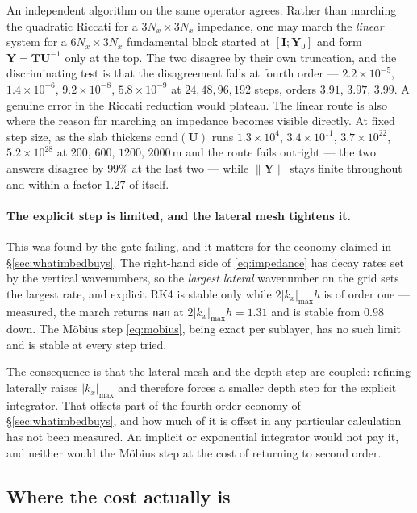 \documentclass[11pt,a4paper]{article}
\newcommand{\bI}{\mathbf{I}}
\newcommand{\bU}{\mathbf{U}}
\newcommand{\bT}{\mathbf{T}}
\newcommand{\bY}{\mathbf{Y}}
\begin{document}
An independent algorithm on the same operator agrees.  Rather than marching the
quadratic Riccati for a $3N_x\times3N_x$ impedance, one may march the
\emph{linear} system for a $6N_x\times3N_x$ fundamental block started at
$[\bI;\bY_0]$ and form $\bY = \bT\bU^{-1}$ only at the top.  The two disagree by
their own truncation, and the discriminating test is that the disagreement
falls at fourth order --- $2.2\times10^{-5}$, $1.4\times10^{-6}$,
$9.2\times10^{-8}$, $5.8\times10^{-9}$ at $24,48,96,192$ steps, orders
$3.91$, $3.97$, $3.99$.  A genuine error in the Riccati reduction would plateau.
The linear route is also where the reason for marching an impedance becomes
visible directly.  At fixed step size, as the slab thickens
$\mathrm{cond}(\bU)$ runs $1.3\times10^{4}$, $3.4\times10^{11}$,
$3.7\times10^{22}$, $5.2\times10^{28}$ at $200$, $600$, $1200$, $2000$\,m and
the route fails outright --- the two answers disagree by $99\%$ at the last two
--- while $\|\bY\|$ stays finite throughout and within a factor $1.27$ of
itself.

\paragraph{The explicit step is limited, and the lateral mesh tightens it.}
This was found by the gate failing, and it matters for the economy claimed in
\S\ref{sec:whatimbedbuys}.  The right-hand side of \eqref{eq:impedance} has
decay rates set by the vertical wavenumbers, so the \emph{largest lateral}
wavenumber on the grid sets the largest rate, and explicit RK4 is stable only
while $2|k_x|_{\max}h$ is of order one --- measured, the march returns
\texttt{nan} at $2|k_x|_{\max}h = 1.31$ and is stable from $0.98$ down.  The
M\"obius step \eqref{eq:mobius}, being exact per sublayer, has no such limit and
is stable at every step tried.

The consequence is that the lateral mesh and the depth step are coupled:
refining laterally raises $|k_x|_{\max}$ and therefore forces a smaller depth
step for the explicit integrator.  That offsets part of the fourth-order economy
of \S\ref{sec:whatimbedbuys}, and how much of it is offset in any particular
calculation has not been measured.  An implicit or exponential integrator would
not pay it, and neither would the M\"obius step at the cost of returning to
second order.

\subsection{Where the cost actually is}\label{sec:latcost}
\end{document}
